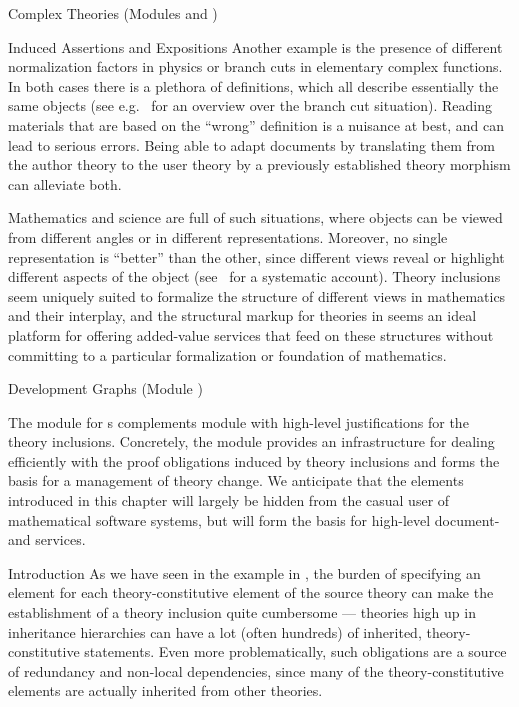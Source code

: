 \begin{tchapter}[id=complex-theories,short=Complex Theories]{Complex Theories (Modules
    {} and {})}
\begin{tsection}[id=induced-assertions,short=Induced Assertions]{Induced Assertions and Expositions}
Another example is the presence of different normalization factors in physics or branch
cuts in elementary complex functions. In both cases there is a plethora of definitions,
which all describe essentially the same objects (see e.g.~\cite{BraCor:raefca02} for an
overview over the branch cut situation). Reading materials that are based on the ``wrong''
definition is a nuisance at best, and can lead to serious errors. Being able to adapt
documents by translating them from the author theory to the user theory by a previously
established theory morphism can alleviate both.

Mathematics and science are full of such situations, where objects can be viewed from
different angles or in different representations. Moreover, no single representation is
``better'' than the other, since different views reveal or highlight different aspects of
the object (see~\cite{KohKoh:aesmk05} for a systematic account). Theory inclusions seem
uniquely suited to formalize the structure of different views in mathematics and their
interplay, and the structural markup for theories in {\omdoc} seems an ideal platform for
offering added-value services that feed on these structures without committing to a
particular formalization or foundation of mathematics.
\end{tsection}

\begin{tsection}[id=development-graphs,short=Development Graphs]{Development Graphs
    (Module {})}
  
  The {\omdoc} module {} for {s} complements
  module {} with high-level justifications for the theory inclusions.
  Concretely, the module provides an infrastructure for dealing efficiently with the proof
  obligations induced by theory inclusions and forms the basis for a management of theory
  change. We anticipate that the elements introduced in this
  chapter will largely be hidden from the casual user of mathematical software systems,
  but will form the basis for high-level document- and
  {} services.


\begin{tsubsection}[id=dg-intro,short=Introduction]{Introduction}
  As we have seen in the example in {}, the burden of
  specifying an {} element for each theory-constitutive element of the
  source theory can make the establishment of a theory inclusion quite cumbersome ---
  theories high up in inheritance hierarchies can have a lot (often hundreds) of inherited,
  theory-constitutive statements.  Even more problematically, such obligations are a
  source of redundancy and non-local dependencies, since many of the theory-constitutive
  elements are actually inherited from other theories.
  

\end{tsubsection}
\end{tsection}
\end{tchapter}
